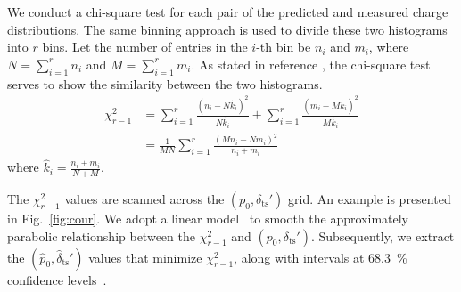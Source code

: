 We conduct a chi-square test for each pair of the predicted and measured charge distributions. The same binning approach is used to divide these two histograms into \(r\) bins. Let the number of entries in the \(i\)-th bin be \(n_i\) and \(m_{i}\), where \(N=\sum_{i = 1}^{r}n_{i}\) and \(M=\sum_{i = 1}^{r}m_{i}\). As stated in reference \cite{2006Comparison}, the chi-square test serves to show the similarity between the two histograms.
\begin{equation}
	\label{eq:chi}
	\begin{aligned}
		\chi^2_{r-1} & =\sum_{{i}=1}^r \frac{\left(n_{i}-N \hat{k}_{i}\right)^2}{N \hat{k}_{i}}+\sum_{{i}=1}^r\frac{\left(m_{i}-M \hat{k}_{i}\right)^2}{M \hat{k}_{i}} \\
		             & =\frac{1}{M N} \sum_{{i}=1}^r\frac{\left(M n_{i}-N m_{i}\right)^2}{n_{i}+m_{i}}
	\end{aligned}
\end{equation}
where \(\hat{k}_{i}=\frac{n_{i}+m_{i}}{N+M}\).

The \(\chi^2_{r - 1}\) values are scanned across the \((p_0,\delta_{\mathrm{ts}}')\) grid. An example is presented in Fig.~\ref{fig:cour}. We adopt a linear model~\cite{Gelman_Hill_2006} to smooth the approximately parabolic relationship between the \(\chi^2_{r - 1}\) and \((p_0, \delta_{\mathrm{ts}}')\). Subsequently, we extract the \((\hat{p}_0, \hat{\delta}_{\mathrm{ts}}')\) values that minimize \(\chi^2_{r - 1}\), along with intervals at \SI{68.3}{\percent} confidence levels~\cite{cowan1997statistical}.

